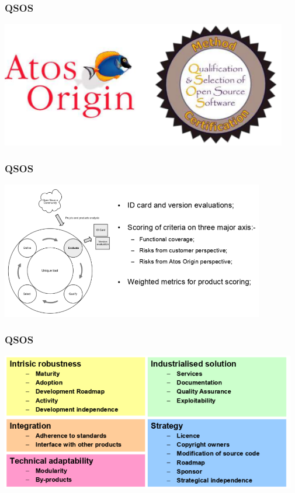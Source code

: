 \documentclass[17pt,aspectratio=169,hyperref=pdfusetitle]{beamer}
\begin{document}
\begin{frame}[fragile]
  \frametitle{QSOS}

  \begin{center}
  \includegraphics[height=5.5cm]{figs/qsos}
  \end{center}  

\end{frame}


\begin{frame}[fragile]
  \frametitle{QSOS}

  \begin{center}
  \includegraphics[height=6cm]{figs/qsos-model}
  \end{center}  

\end{frame}


\begin{frame}[fragile]
  \frametitle{QSOS}

  \begin{center}
  \includegraphics[height=6cm]{figs/qsos-risks}
  \end{center}  

\end{frame}
\end{document}
